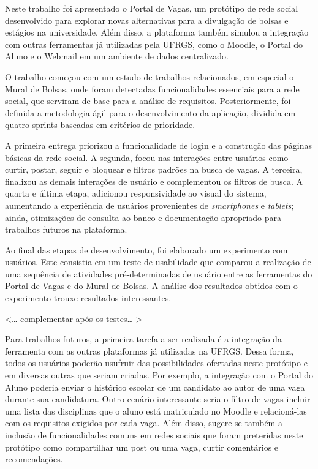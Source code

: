 \documentclass[cic,tc]{iiufrgs}
\begin{document}
Neste trabalho foi apresentado o Portal de Vagas, um protótipo de rede social desenvolvido para explorar novas alternativas para a divulgação de bolsas e estágios na universidade. Além disso, a plataforma também simulou a integração com outras ferramentas já utilizadas pela UFRGS, como o Moodle, o Portal do Aluno e o Webmail em um ambiente de dados centralizado.

O trabalho começou com um estudo de trabalhos relacionados, em especial o Mural de Bolsas, onde foram detectadas funcionalidades essenciais para a rede social, que serviram de base para a análise de requisitos. Posteriormente, foi definida a metodologia ágil para o desenvolvimento da aplicação, dividida em quatro sprints baseadas em critérios de prioridade. 

A primeira entrega priorizou a funcionalidade de login e a construção das páginas básicas da rede social. A segunda, focou nas interações entre usuários como curtir, postar, seguir e bloquear e filtros padrões na busca de vagas. A terceira, finalizou as demais interações de usuário e complementou os filtros de busca. A quarta e última etapa, adicionou responsividade ao visual do sistema, aumentando a experiência de usuários provenientes de \textit{smartphones} e \textit{tablets}; ainda, otimizações de consulta ao banco e documentação apropriado para trabalhos futuros na plataforma.

Ao final das etapas de desenvolvimento, foi elaborado um experimento com usuários. Este consistia em um teste de usabilidade que comparou a realização de uma sequência de atividades pré-determinadas de usuário entre as ferramentas do Portal de Vagas e do Mural de Bolsas. A análise dos resultados obtidos com o experimento trouxe resultados interessantes.

<… complementar após os testes… >


Para trabalhos futuros, a primeira tarefa a ser realizada é a integração da ferramenta com as outras plataformas já utilizadas na UFRGS. Dessa forma, todos os usuários poderão usufruir das possibilidades ofertadas neste protótipo e em diversas outras que seriam criadas. Por exemplo, a integração com o Portal do Aluno poderia enviar o histórico escolar de um candidato ao autor de uma vaga durante sua candidatura. Outro cenário interessante seria o filtro de vagas incluir uma lista das disciplinas que o aluno está matriculado no Moodle e relacioná-las com os requisitos exigidos por cada vaga. Além disso, sugere-se também a inclusão de funcionalidades comuns em redes sociais que foram preteridas neste protótipo como compartilhar um post ou uma vaga, curtir comentários e recomendações.
\end{document}
